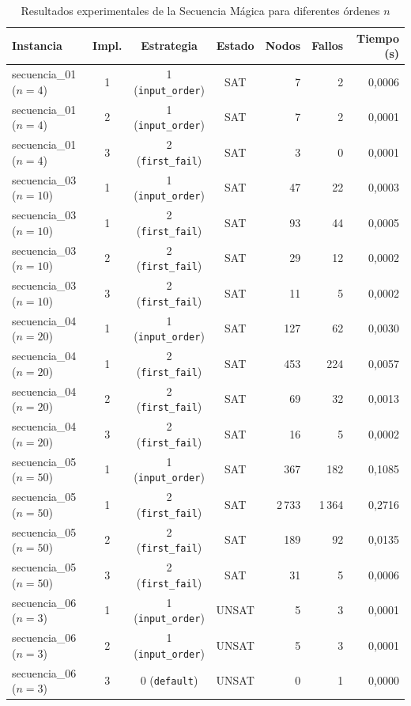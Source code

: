 \begin{table}[htbp]
\small
\caption{Resultados experimentales de la Secuencia Mágica para diferentes órdenes $n$}
\label{tab:secuencia-resultados}
\begin{tabular}{lcccrrr}
\toprule
\textbf{Instancia} & \textbf{Impl.} & \textbf{Estrategia} & \textbf{Estado} & \textbf{Nodos} & \textbf{Fallos} & \textbf{Tiempo (s)} \\
\midrule
secuencia\_01 ($n=4$)  & 1 & 1 (\texttt{input\_order}) & SAT & 7 & 2 & 0,0006 \\
secuencia\_01 ($n=4$)  & 2 & 1 (\texttt{input\_order}) & SAT & 7 & 2 & 0,0001 \\
secuencia\_01 ($n=4$)  & 3 & 2 (\texttt{first\_fail})  & SAT & 3 & 0 & 0,0001 \\
\midrule
secuencia\_03 ($n=10$) & 1 & 1 (\texttt{input\_order}) & SAT & 47 & 22 & 0,0003 \\
secuencia\_03 ($n=10$) & 1 & 2 (\texttt{first\_fail})  & SAT & 93 & 44 & 0,0005 \\
secuencia\_03 ($n=10$) & 2 & 2 (\texttt{first\_fail})  & SAT & 29 & 12 & 0,0002 \\
secuencia\_03 ($n=10$) & 3 & 2 (\texttt{first\_fail})  & SAT & 11 & 5 & 0,0002 \\
\midrule
secuencia\_04 ($n=20$) & 1 & 1 (\texttt{input\_order}) & SAT & 127 & 62 & 0,0030 \\
secuencia\_04 ($n=20$) & 1 & 2 (\texttt{first\_fail})  & SAT & 453 & 224 & 0,0057 \\
secuencia\_04 ($n=20$) & 2 & 2 (\texttt{first\_fail})  & SAT & 69 & 32 & 0,0013 \\
secuencia\_04 ($n=20$) & 3 & 2 (\texttt{first\_fail})  & SAT & 16 & 5 & 0,0002 \\
\midrule
secuencia\_05 ($n=50$) & 1 & 1 (\texttt{input\_order}) & SAT & 367 & 182 & 0,1085 \\
secuencia\_05 ($n=50$) & 1 & 2 (\texttt{first\_fail})  & SAT & 2\,733 & 1\,364 & 0,2716 \\
secuencia\_05 ($n=50$) & 2 & 2 (\texttt{first\_fail})  & SAT & 189 & 92 & 0,0135 \\
secuencia\_05 ($n=50$) & 3 & 2 (\texttt{first\_fail})  & SAT & 31 & 5 & 0,0006 \\
\midrule
secuencia\_06 ($n=3$)  & 1 & 1 (\texttt{input\_order}) & UNSAT & 5 & 3 & 0,0001 \\
secuencia\_06 ($n=3$)  & 2 & 1 (\texttt{input\_order}) & UNSAT & 5 & 3 & 0,0001 \\
secuencia\_06 ($n=3$)  & 3 & 0 (\texttt{default})      & UNSAT & 0 & 1 & 0,0000 \\
\bottomrule
\end{tabular}
\end{table}

